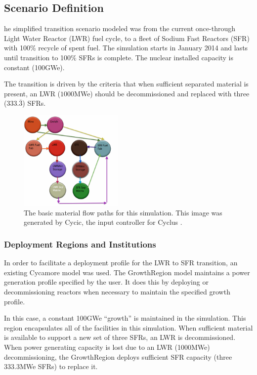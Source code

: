 \subsection{Scenario Definition}
he simplified transition scenario modeled was from the current once-through
Light Water Reactor (LWR) fuel cycle, to a fleet of Sodium Fast Reactors (SFR)
with 100\% recycle of spent fuel.  The simulation starts in January 2014 and
lasts until transition to 100\% SFRs is complete. The nuclear installed
capacity is constant (100GWe).

The transition is driven by the criteria that when sufficient separated
material is present, an LWR ($1000$MWe) should be decommissioned and replaced
with three ($333.\bar{3}$) SFRs.

\begin{figure}[htpb!]
\begin{center}
\includegraphics[width=0.45\textwidth]{cycic_img.eps}
\end{center}
\caption{The basic material flow paths for this simulation. This image was 
generated by Cycic, the input controller for Cyclus 
\cite{flannagan_cycic_2013}.}
\label{fig:cycic_img}
\end{figure}

\subsubsection{Deployment Regions and Institutions}

In order to facilitate a deployment profile for the LWR to SFR transition, an 
existing Cycamore model was used. The GrowthRegion model maintains a 
power generation profile specified by the user. It does this by deploying or 
decommissioning reactors when necessary to maintain the specified growth 
profile.  

In this case, a constant 100GWe ``growth'' is maintained in the simulation. 
This region encapsulates all of the facilities in this simulation. 
When sufficient material is available to support a new set of three SFRs, an 
LWR is decommissioned. When power generating capacity is lost due to an LWR 
(1000MWe) decommissioning, the GrowthRegion deploys sufficient SFR capacity 
(three 333.3MWe SFRs) to replace it. 

